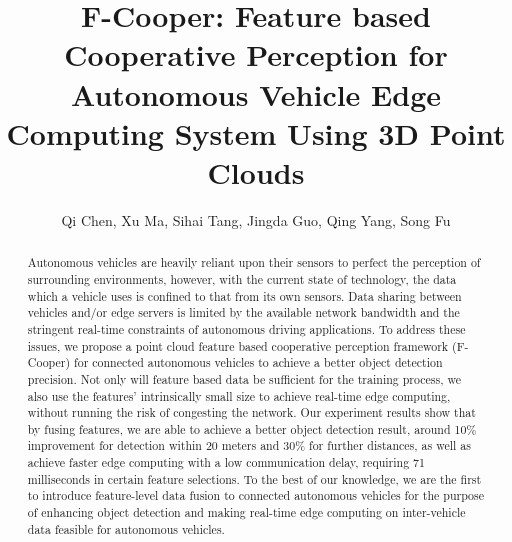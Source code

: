 \documentclass[sigconf]{acmart}
\begin{document}
\title{F-Cooper: Feature based Cooperative Perception for Autonomous Vehicle Edge Computing System Using 3D Point Clouds}





\author{Qi Chen, Xu Ma, Sihai Tang, Jingda Guo, Qing Yang, Song Fu}


\begin{abstract}

Autonomous vehicles are heavily reliant upon their sensors to perfect the perception of surrounding environments, however, with the current state of technology, the data which a vehicle uses is confined to that from its own sensors. Data sharing between vehicles and/or edge servers is limited by the available network bandwidth and the stringent real-time constraints of autonomous driving applications. To address these issues, we propose a point cloud feature based cooperative perception framework (F-Cooper) for connected autonomous vehicles to achieve a better object detection precision. 
Not only will feature based data be sufficient for the training process, we also use the features' intrinsically small size to achieve real-time edge computing, without running the risk of congesting the network. 
Our experiment results show that by fusing features, we are able to achieve a better object detection result, around 10\% improvement for detection within 20 meters and 30\% for further distances, as well as achieve faster edge computing with a low communication delay, requiring 71 milliseconds in certain feature selections.
To the best of our knowledge, we are the first to introduce feature-level data fusion to connected autonomous vehicles for the purpose of enhancing object detection and making real-time edge computing on inter-vehicle data feasible for autonomous vehicles.

\end{abstract}


\maketitle
\end{document}
